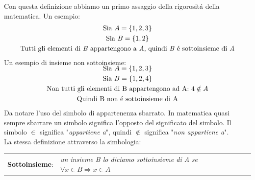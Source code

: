 \documentclass[twoside]{article} %
\begin{document}
	\noindent Con questa definizione abbiamo un primo assaggio della rigorosit\'a della matematica. Un esempio:
	\useshortskip	
	\begin{gather*}
		\text{Sia }A=\{1,2,3\}\\
		\text{Sia }B=\{1,2\}\\
		\text{Tutti gli elementi di \textit{B} appartengono a \textit{A}, quindi \textit{B} \'e sottoinsieme di \textit{A}}
	\end{gather*}
	Un esempio di insieme non sottoinsieme:
	\begin{gather*}\SwapAboveDisplaySkip \baselineskip=0pt
		\text{Sia }A=\{1,2,3\}\\
		\text{Sia }B=\{1,2,4\}\\
		\text{Non tutti gli elementi di B appartengono ad A: }4\notin A\\
		\text{Quindi B non \'e sottoinsieme di A}
	\end{gather*}	
	Da notare l'uso del simbolo di appartenenza sbarrato. In matematica quasi sempre sbarrare un simbolo significa l'opposto del significato del simbolo. Il simbolo $\in$ significa "\textit{appartiene a}", quindi $\notin$ significa "\textit{non appartiene a}".\\
	La stessa definizione attraverso la simbologia:
	
	\begin{center}
		\begin{tabular}{ll}
			\textbf{Sottoinsieme}:&\makecell[tl]{\textit{un insieme B lo diciamo sottoinsieme di A}\\\textit{se $\forall x\in B\Rightarrow x\in A$}}
		\end{tabular}
	\end{center}
	
\end{document}
